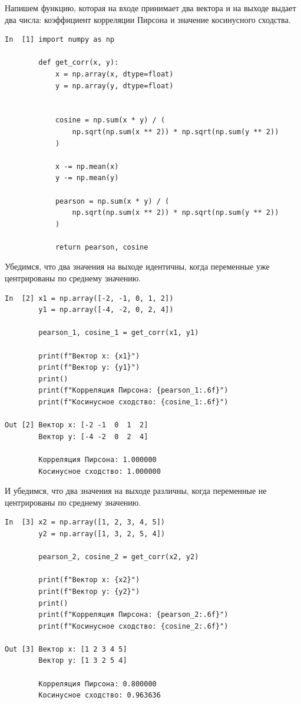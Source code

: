\documentclass{article}
\begin{document}
Напишем функцию, которая на входе принимает два вектора и на выходе выдает два числа: коэффициент корреляции Пирсона и значение косинусного сходства.

\begin{verbatim}
In  [1] import numpy as np

        def get_corr(x, y):
            x = np.array(x, dtype=float)
            y = np.array(y, dtype=float)
            

            cosine = np.sum(x * y) / (
                np.sqrt(np.sum(x ** 2)) * np.sqrt(np.sum(y ** 2))
            )
            
            x -= np.mean(x)
            y -= np.mean(y)
            
            pearson = np.sum(x * y) / (
                np.sqrt(np.sum(x ** 2)) * np.sqrt(np.sum(y ** 2))
            )
            
            return pearson, cosine
\end{verbatim}

Убедимся, что два значения на выходе идентичны, когда переменные уже центрированы по среднему значению.

\begin{verbatim}
In  [2] x1 = np.array([-2, -1, 0, 1, 2])
        y1 = np.array([-4, -2, 0, 2, 4])

        pearson_1, cosine_1 = get_corr(x1, y1)

        print(f"Вектор x: {x1}")
        print(f"Вектор y: {y1}")
        print()
        print(f"Корреляция Пирсона: {pearson_1:.6f}")
        print(f"Косинусное сходство: {cosine_1:.6f}")

Out [2] Вектор x: [-2 -1  0  1  2]
        Вектор y: [-4 -2  0  2  4]
        
        Корреляция Пирсона: 1.000000
        Косинусное сходство: 1.000000
\end{verbatim}

И убедимся, что два значения на выходе различны, когда переменные не центрированы по среднему значению.

\begin{verbatim}
In  [3] x2 = np.array([1, 2, 3, 4, 5])
        y2 = np.array([1, 3, 2, 5, 4])

        pearson_2, cosine_2 = get_corr(x2, y2)

        print(f"Вектор x: {x2}")
        print(f"Вектор y: {y2}")
        print()
        print(f"Корреляция Пирсона: {pearson_2:.6f}")
        print(f"Косинусное сходство: {cosine_2:.6f}")

Out [3] Вектор x: [1 2 3 4 5]
        Вектор y: [1 3 2 5 4]

        Корреляция Пирсона: 0.800000
        Косинусное сходство: 0.963636
\end{verbatim}
\end{document}
